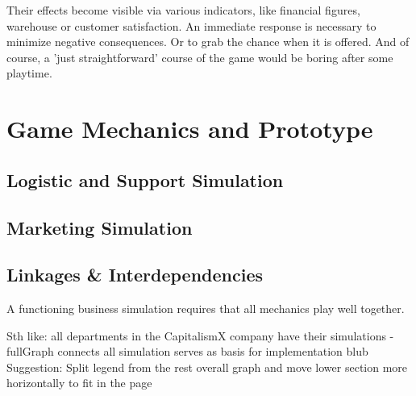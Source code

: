 \documentclass[11pt,titlepage,oneside,openany]{book}
\begin{document}
Their effects become visible via various indicators, like financial figures, warehouse or customer satisfaction. An immediate response is necessary to minimize negative consequences. Or to grab the chance when it is offered. And of course, a 'just straightforward' course of the game would be boring after some playtime. 

\chapter{Game Mechanics and Prototype}
\label{cha:alg}










\section{Logistic and Support Simulation}



\section{Marketing Simulation}
\label{markting_simulation}













\section{Linkages \& Interdependencies}
\label{sec:link}
A functioning business simulation requires that all mechanics play well together.  


Sth like: all departments in the CapitalismX company have their simulations - fullGraph connects all simulation
serves as basis for implementation blub
Suggestion: Split legend from the rest overall graph and move lower section more horizontally to fit in the page
\end{document}
